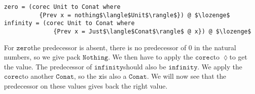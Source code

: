 \documentclass[a4paper,cleardoubleempty,BCOR1cm]{scrbook}
\begin{document}
\begin{lstlisting}
zero = (corec Unit to Conat where
          {Prev x = nothing$\langle$Unit$\rangle$}) @ $\lozenge$
infinity = (corec Unit to Conat where
              {Prev x = Just$\langle$Conat$\rangle$ @ x}) @ $\lozenge$
\end{lstlisting}

For $\mathtt{zero}$\;the predecessor is absent, there is no predecessor of 0 in the
natural numbers, so we give pack $\mathtt{Nothing}$.  We then have to apply the
$\mathtt{corec}$\;to $\mathtt{\lozenge}$\;to get the value.  The predecessor of $\mathtt{infinity}$\;should also
be $\mathtt{infinity}$.  We apply the $\mathtt{corec}$\;to another $\mathtt{Conat}$, so the $\mathtt{x}$\;is also a
$\mathtt{Conat}$.  We will now see that the predecessor on these values gives back the
right value.
\end{document}
